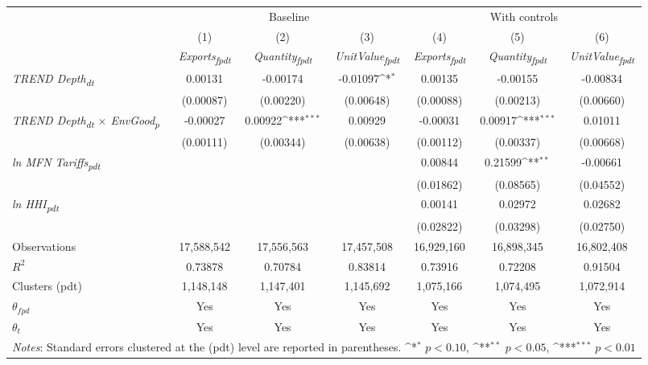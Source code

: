 {
\def\sym#1{\ifmmode^{#1}\else\(^{#1}\)\fi}
\begin{tabular}{l*{6}{c}}
\toprule
&\multicolumn{3}{c}{Baseline}&\multicolumn{3}{c}{With controls}\\\cmidrule(lr){2-4}\cmidrule(lr){5-7}
&(1)&(2)&(3)&(4)&(5)&(6)\\
&\textit{Exports\textsubscript{fpdt}}&\textit{Quantity\textsubscript{fpdt}}&\textit{UnitValue\textsubscript{fpdt}}&\textit{Exports\textsubscript{fpdt}}&\textit{Quantity\textsubscript{fpdt}}&\textit{UnitValue\textsubscript{fpdt}}\\
\midrule
\textit{TREND Depth\textsubscript{dt}} & 0.00131 & -0.00174 & -0.01097\sym{*} & 0.00135 & -0.00155 & -0.00834\\
 & (0.00087) & (0.00220) & (0.00648) & (0.00088) & (0.00213) & (0.00660)\\
\addlinespace
\textit{TREND Depth\textsubscript{dt} $\times$ EnvGood\textsubscript{p}} & -0.00027 & 0.00922\sym{***} & 0.00929 & -0.00031 & 0.00917\sym{***} & 0.01011\\
 & (0.00111) & (0.00344) & (0.00638) & (0.00112) & (0.00337) & (0.00668)\\
\addlinespace
\textit{ln MFN Tariffs\textsubscript{pdt}} &  &  &  & 0.00844 & 0.21599\sym{**} & -0.00661\\
 &  &  &  & (0.01862) & (0.08565) & (0.04552)\\
\addlinespace
\textit{ln HHI\textsubscript{pdt}} &  &  &  & 0.00141 & 0.02972 & 0.02682\\
 &  &  &  & (0.02822) & (0.03298) & (0.02750)\\
\midrule
Observations & 17,588,542 & 17,556,563 & 17,457,508 & 16,929,160 & 16,898,345 & 16,802,408\\
$R^{2}$ & 0.73878 & 0.70784 & 0.83814 & 0.73916 & 0.72208 & 0.91504\\
Clusters (pdt) & 1,148,148 & 1,147,401 & 1,145,692 & 1,075,166 & 1,074,495 & 1,072,914\\
$\theta_{fpd}$ & Yes & Yes & Yes & Yes & Yes & Yes\\
$\theta_{t}$ & Yes & Yes & Yes & Yes & Yes & Yes\\
\bottomrule
\multicolumn{7}{l}{\footnotesize \textit{Notes}: Standard errors clustered at the (pdt) level are reported in parentheses. \sym{*} \(p<0.10\), \sym{**} \(p<0.05\), \sym{***} \(p<0.01\)}\\
\end{tabular}
}

